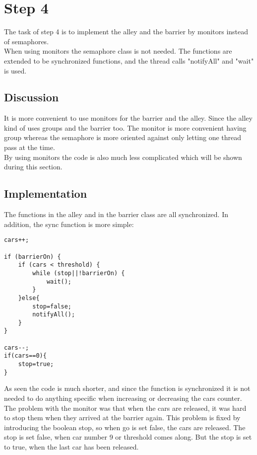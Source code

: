 \section{Step 4}
The task of step 4 is to implement the alley and the barrier by monitors instead of semaphores. \\
When using monitors the semaphore class is not needed. The functions are extended to be synchronized functions, and the thread calls "notifyAll" and "wait" is used.

\subsection{Discussion}
It is more convenient to use monitors for the barrier and the alley. Since the alley kind of uses groups and the barrier too. The monitor is more convenient having group whereas the semaphore is more oriented against only letting one thread pass at the time. \\
By using monitors the code is also much less complicated which will be shown during this section.

\subsection{Implementation}
The functions in the alley and in the barrier class are all synchronized. In addition, the sync function is more simple: 

\begin{lstlisting}
cars++;

if (barrierOn) {
	if (cars < threshold) {
		while (stop||!barrierOn) {
			wait();	
		}
	}else{
		stop=false;
		notifyAll();
	}
} 

cars--;
if(cars==0){
	stop=true;
}
\end{lstlisting}
\vspace{.8cm}

As seen the code is much shorter, and since the function is synchronized it is not needed to do anything specific when increasing or decreasing the cars counter. The problem with the monitor was that when the cars are released, it was hard to stop them when they arrived at the barrier again. This problem is fixed by introducing the boolean stop, so when go is set false, the cars are released. The stop is set false, when car number 9 or threshold comes along. But the stop is set to true, when 
the last car has been released.